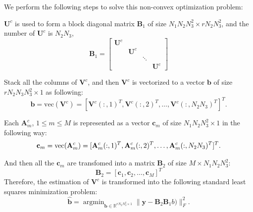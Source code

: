 \documentclass[futureinternet,article,submit,moreauthors,pdftex,10pt,a4paper]{Definitions/mdpi}
\theoremstyle{plain}
\theoremstyle{definition}
\theoremstyle{remark}
\begin{document}
We perform the following steps to solve this non-convex optimization problem:
\begin{steps}
\item $\mathbf{U}^c$ is used to form a block diagonal matrix $\mathbf{B}_1$ of size $N_1N_2N^2_3 \times rN_2N^2_3$, and the number of $\mathbf{U}^c$ is $N_2N_3$,
    \begin{equation}
        \mathbf{B}_1 = 
        \begin{bmatrix}
            \mathbf{U}^c & & & \\
            & \mathbf{U}^c & & \\
            & & \ddots & \\
            & & & \mathbf{U}^c
        \end{bmatrix}
    \end{equation}
\item Stack all the columns of $\mathbf{V}^c$, and then $\mathbf{V}^c$ is vectorized to a vector $\mathbf{b}$ of size $rN_2N_3N^2_3 \times 1$ as following:
    \begin{equation}
        \mathbf{b} = \text{vec}(\mathbf{V}^c) =[\mathbf{V}^c(:,1)^T, \mathbf{V}^c(:,2)^T, \dots, \mathbf{V}^c(:,N_2N_3)^T]^T. 
    \end{equation}

\item Each $\mathbf{A}^c_m$, $1 \leq m \leq M$ is represented as a vector $\mathbf{c}_m$ of size $N_1N_2N^2_3 \times 1$ in the following way:
    \begin{equation}
        \mathbf{c}_m = \text{vec}(\mathbf{A}^c_m) \\
        =[\mathbf{A}^c_m(:,1)^T, \mathbf{A}^c_m(:,2)^T, \dots, \mathbf{A}^c_m(:,N_2N_3)^T]^T.
    \end{equation}

    And then all the $\mathbf{c}_m$ are transfomed into a matrix $\mathbf{B}_2$ of size $M \times N_1N_2N^2_3$:
    \begin{equation}
        \mathbf{B}_2 = [\mathbf{c}_1, \mathbf{c}_2, \dots, \mathbf{c}_M]^T
    \end{equation}
    Therefore, the estimation of $\mathbf{V}^c$ is transformed into the following standard least squares minimization problem:
        \begin{equation}
            \widehat{\mathbf{b}} =
            \mathop{\arg\min}_{ \mathbf{b} \in \mathbb{R}^{rN_2N^2_3 \times 1}} \| \mathbf{y} - \mathbf{B}_2\mathbf{B}_1b) \|_F^2 .
        \end{equation}

\end{steps}
\end{document}
